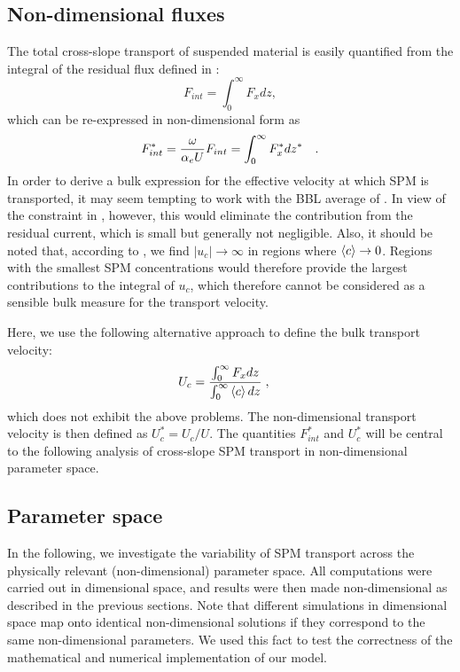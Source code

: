 \subsection{Non-dimensional fluxes}
The total cross-slope transport of suspended material is easily
quantified from the integral of the residual flux defined in :
\begin{equation}
  \label{FxInt}
  F_{int} = \int_0^\infty F_x dz \comma
\end{equation}
which can be re-expressed in non-dimensional form as
\begin{equation}
  \label{FxIntND}
  F_{int}^\ast =  \dfrac{\omega}{\alpha_e U} F_{int} 
             = \int_0^\infty F_x^\ast dz^\ast \quad .
\end{equation}
In order to derive a bulk expression for the effective velocity at
which SPM is transported, it may seem tempting to work with the BBL
average of . In view of the constraint in ,
however, this would eliminate the contribution from the residual
current, which is small but generally not negligible. Also, it should
be noted that, according to , we find $|u_c| \rightarrow
\infty$ in regions where $\left\langle c \right\rangle \rightarrow 0$. Regions with the
smallest SPM concentrations would therefore provide the largest
contributions to the integral of $u_c$, which therefore cannot be
considered as a sensible bulk measure for the transport velocity.


Here, we use the following alternative approach to define the bulk
transport velocity:
\begin{equation}
  \label{U_c}
  U_c = \dfrac{\int_0^\infty F_x dz}{\int_0^\infty \left\langle c \right\rangle dz} 
  \; , \quad
\end{equation}
which does not exhibit the above problems. The non-dimensional
transport velocity is then defined as $U_c^\ast = U_c / U$. The
quantities $F_{int}^\ast$ and $U_c^\ast$ will be central to the
following analysis of cross-slope SPM transport in non-dimensional
parameter space.

\subsection{Parameter space}
In the following, we investigate the variability of SPM transport
across the physically relevant (non-dimensional) parameter space. All
computations were carried out in dimensional space, and results were
then made non-dimensional as described in the previous sections. Note
that different simulations in dimensional space map onto identical
non-dimensional solutions if they correspond to the same
non-dimensional parameters. We used this fact to test the correctness
of the mathematical and numerical implementation of our model.

